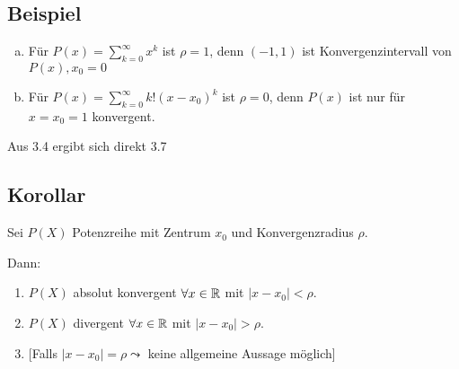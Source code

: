 \documentclass[10pt, a4paper, fleqn]{article}
\begin{document}
    \subsection{Beispiel}
    \begin{enumerate}[a)]
        \item Für $P(x) = \sum_{k=0}^\infty x^k$ ist $\rho = 1$, denn $(-1, 1)$ ist Konvergenzintervall von $P(x), x_0=0$
        \item Für $P(x) = \sum_{k=0}^\infty k!(x-x_0)^k$ ist $\rho = 0$, denn $P(x)$ ist nur für $x=x_0=1$ konvergent.
    \end{enumerate}
    Aus 3.4 ergibt sich direkt 3.7

    \subsection{Korollar}
    Sei $P(X)$ Potenzreihe mit Zentrum $x_0$ und Konvergenzradius $\rho$. 
    
    Dann:
    \begin{enumerate}
        \item $P(X)$ absolut konvergent $\forall x \in \mathbb{R}$ mit $|x-x_0| < \rho$.
        \item $P(X)$ divergent $\forall x \in \mathbb{R}$ mit $|x-x_0| > \rho$.
        \item {[Falls $|x-x_0| = \rho \leadsto$ keine allgemeine Aussage möglich]}
    \end{enumerate}
    
\ifdefined\MAINDOC\else
\end{document}
